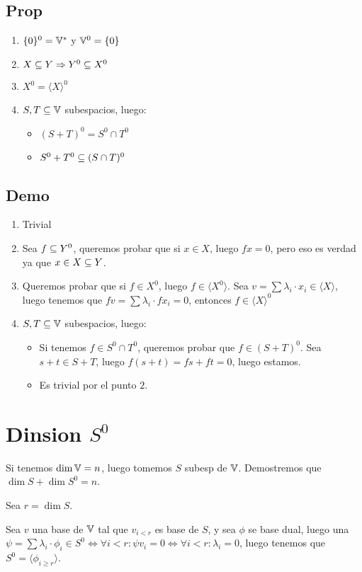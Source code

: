 \documentclass{article}
\begin{document}
	\subsection*{Prop}
	\begin{enumerate}
		\item $\{0\}^0 = \mathbb{V}^*$ y $\mathbb{V}^0 = \{0\}$
		\item $X \subseteq Y \Rightarrow Y^0 \subseteq X^0$
		\item $X^0 = \langle X \rangle ^0$
		\item $S, T \subseteq \mathbb{V}$ subespacios, luego:
			\begin{itemize}
				\item $(S + T)^0 = S^0 \cap T^0$
				\item $S^0 + T^0 \subseteq (S \cap T)^0$
			\end{itemize}
	\end{enumerate}
	\subsection*{Demo}
	\begin{enumerate}
		\item Trivial
		\item Sea $f \subseteq Y^0$, queremos probar que si $x \in X$, luego $fx = 0$,
			pero eso es verdad ya que $x \in X \subseteq Y$.
		\item Queremos probar que si $f \in X^0$, luego $f \in \langle X^0
			\rangle$. Sea $v = \sum \lambda_i \cdot x_i \in \langle X
			\rangle$, luego
			tenemos que $f v = \sum \lambda_i \cdot fx_i = 0$, entonces $f \in
			\langle X \rangle ^ 0$
		\item $S, T \subseteq \mathbb{V}$ subespacios, luego:
			\begin{itemize}
				\item Si tenemos $f \in S^0 \cap T^0$, queremos probar que $f \in
					(S+T)^0$. Sea $s + t \in S + T$, luego $f (s+t) = fs + ft = 0$,
					luego estamos.
				\item Es trivial por el punto $2$.
			\end{itemize}
	\end{enumerate}

	\section*{Dinsion $S^0$}
	Si tenemos $\dim \mathbb{V} = n$, luego tomemos $S$ subesp de $\mathbb{V}$. Demostremos que
	$\dim S + \dim S^0 = n$.

	Sea $r = \dim S$.

	Sea $v$ una base de $\mathbb{V}$ tal que $v_{i < r}$ es base de $S$, y sea $\phi$ se
	base dual, luego una $\psi = \sum \lambda_i \cdot \phi_i \in S^0 \iff
	\forall i < r : \psi v_i = 0 \iff \forall i < r : \lambda_i = 0$, luego
	tenemos que $S^0 = \langle \phi_{i \geq r} \rangle$.
\end{document}
